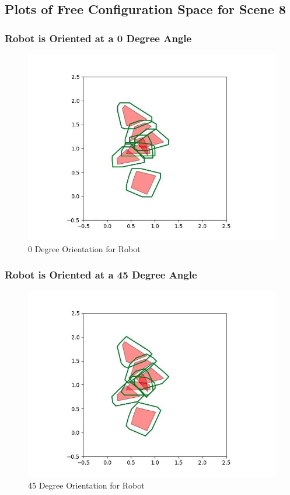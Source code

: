 \documentclass{article}
\begin{document}
\newpage
\subsection{Plots of Free Configuration Space for Scene 8}
\subsubsection{Robot is Oriented at a 0 Degree Angle}
\begin{figure}[h!]
	\includegraphics[width= 0.9 \linewidth]{Problem3_minkowski8_0.jpg}
	\centering
	\caption{0 Degree Orientation for Robot}
	\label{Problem3_minkowski8_0.jpg}
\end{figure}

\newpage
\subsubsection{Robot is Oriented at a 45 Degree Angle}
\begin{figure}[h!]
	\includegraphics[width= 0.9 \linewidth]{Problem3_minkowski8_45.jpg}
	\centering
	\caption{45 Degree Orientation for Robot}
	\label{Problem3_minkowski8_45.jpg}
\end{figure}
\end{document}
